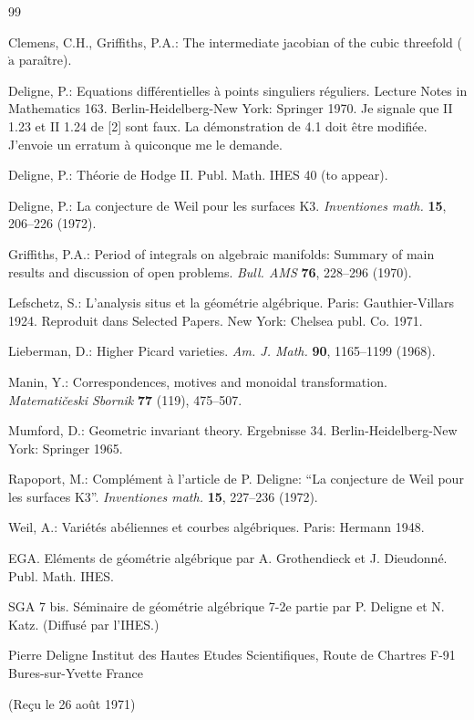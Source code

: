 \documentclass[10pt,leqno]{amsart}
\theoremstyle{plain}
\theoremstyle{definition}
\theoremstyle{remark}
\begin{document}
\begin{thebibliography}{99}

Clemens, C.H., Griffiths, P.A.: The intermediate jacobian of the cubic threefold ($\grave{\text{a}}$ para\^itre).

Deligne, P.: Equations diff\'erentielles \`a points singuliers r\'eguliers. Lecture Notes in Mathematics 163. Berlin-Heidelberg-New York: Springer 1970. Je signale que II 1.23 et II 1.24 de [2] sont faux. La d\'emonstration de 4.1 doit \^etre modifi\'ee. J'envoie un erratum \`a quiconque me le demande.

Deligne, P.: Th\'eorie de Hodge II. Publ. Math. IHES 40 (to appear).

Deligne, P.: La conjecture de Weil pour les surfaces K3. \textit{Inventiones math.} \textbf{15}, 206--226 (1972).

Griffiths, P.A.: Period of integrals on algebraic manifolds: Summary of main results and discussion of open problems. \textit{Bull. AMS} \textbf{76}, 228--296 (1970).

Lefschetz, S.: L'analysis situs et la g\'eom\'etrie alg\'ebrique. Paris: Gauthier-Villars 1924. Reproduit dans Selected Papers. New York: Chelsea publ. Co. 1971.

Lieberman, D.: Higher Picard varieties. \textit{Am. J. Math.} \textbf{90}, 1165--1199 (1968).

Manin, Y.: Correspondences, motives and monoidal transformation. \textit{Matemati\v{c}eski Sbornik} \textbf{77} (119), 475--507.

Mumford, D.: Geometric invariant theory. Ergebnisse 34. Berlin-Heidelberg-New York: Springer 1965.

Rapoport, M.: Compl\'ement \`a l'article de P. Deligne: ``La conjecture de Weil pour les surfaces K3''. \textit{Inventiones math.} \textbf{15}, 227--236 (1972).

Weil, A.: Vari\'et\'es ab\'eliennes et courbes alg\'ebriques. Paris: Hermann 1948.

EGA. El\'ements de g\'eom\'etrie alg\'ebrique par A. Grothendieck et J. Dieudonn\'e. Publ. Math. IHES.

SGA 7 bis. S\'eminaire de g\'eom\'etrie alg\'ebrique 7-2e partie par P. Deligne et N. Katz. (Diffus\'e par l'IHES.)

\end{thebibliography}

\bigskip
\noindent
Pierre Deligne\newline
Institut des Hautes Etudes Scientifiques, Route de Chartres\newline
F-91 Bures-sur-Yvette\newline
France

\medskip
\noindent
(Re\c{c}u le 26 ao\^ut 1971)
\end{document}
